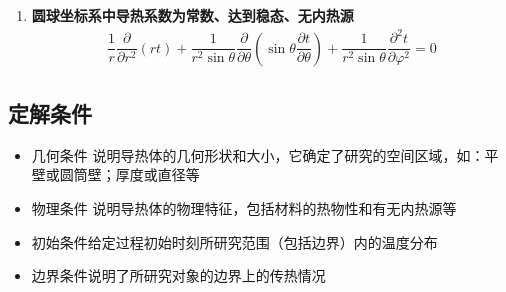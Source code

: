 \begin{enumerate}
	\item \textbf{圆球坐标系中导热系数为常数、达到稳态、无内热源}
	\begin{align}
		\dfrac{1}{r} \dfrac{\partial }{\partial r^2}(rt) + \dfrac{1}{r^2\sin \theta} \dfrac{\partial }{\partial \theta} \left(\sin \theta \dfrac{\partial t}{\partial \theta}\right) + \dfrac{1}{r^2 \sin \theta}\dfrac{\partial^2 t}{\partial \varphi^2}= 0 
	\end{align}
\end{enumerate}

\subsection{定解条件}
\begin{itemize}
	\item 几何条件 \quad 说明导热体的几何形状和大小，它确定了研究的空间区域，如：平壁或圆筒壁；厚度或直径等\vspace*{-0.5em}
	
	\item 物理条件 \quad 说明导热体的物理特征，包括材料的热物性和有无内热源等\vspace*{-0.5em}
	
	\item 初始条件\quad 给定过程初始时刻所研究范围（包括边界）内的温度分布\vspace*{-0.5em}
	
	\item 边界条件\quad 说明了所研究对象的边界上的传热情况\vspace*{-0.5em}
\end{itemize}

